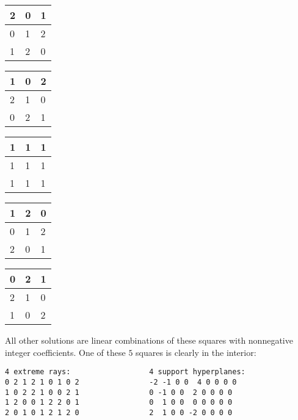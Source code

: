 \documentclass[12pt,a4paper]{scrartcl}
\theoremstyle{definition}
\begin{document}
\begin{center}
	\begin{tabular}{|l|l|l|}
		\hline
		2 & 0 & 1\\
		\hline
		0 & 1 & 2\\
		\hline
		1 & 2 & 0\\
		\hline
	\end{tabular}
	\hspace{10mm}
	\begin{tabular}{|l|l|l|}
		\hline
		1 & 0 & 2\\
		\hline
		2 & 1 & 0\\
		\hline
		0 & 2 & 1\\
		\hline
	\end{tabular}
	\hspace{10mm}
	\begin{tabular}{|l|l|l|}
		\hline
		1 & 1 & 1\\
		\hline
		1 & 1 & 1\\
		\hline
		1 & 1 & 1\\
		\hline
	\end{tabular}
	\hspace{10mm}
	\begin{tabular}{|l|l|l|}
		\hline
		1 & 2 & 0\\
		\hline
		0 & 1 & 2\\
		\hline
		2 & 0 & 1\\
		\hline
	\end{tabular}
	\hspace{10mm}
	\begin{tabular}{|l|l|l|}
		\hline
		0 & 2 & 1\\
		\hline
		2 & 1 & 0\\
		\hline
		1 & 0 & 2\\
		\hline
	\end{tabular}	
\end{center}
All other solutions are linear combinations of these squares
with nonnegative integer coefficients.
One of these $5$ squares is clearly in the interior:
\begin{Verbatim}
4 extreme rays:                  4 support hyperplanes:
0 2 1 2 1 0 1 0 2                -2 -1 0 0  4 0 0 0 0
1 0 2 2 1 0 0 2 1                0 -1 0 0  2 0 0 0 0
1 2 0 0 1 2 2 0 1                0  1 0 0  0 0 0 0 0
2 0 1 0 1 2 1 2 0                2  1 0 0 -2 0 0 0 0
\end{Verbatim}
\end{document}
